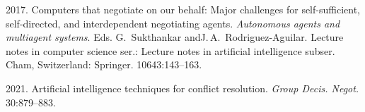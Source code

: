 \begin{multicols}{2}
{{\begin{thebibliography}{99}
    2017. 
Computers that negotiate on our behalf: Major challenges for self-sufficient, self-directed, and 
interdependent negotiating agents. \textit{Autonomous agents and multiagent systems}. Eds. 
G.~{Sukthan\-kar} and\linebreak  J.\,A.~Rodriguez-Aguilar. Lecture notes in computer science ser.:
Lecture notes in artificial 
intelligence subser. Cham, Switzerland: Springer. 
10643:143--163. 


    2021. Artificial 
intelligence techniques for conflict resolution. \textit{Group Decis. Negot.}  
30:879--883.



\end{thebibliography}}}
\end{multicols}
